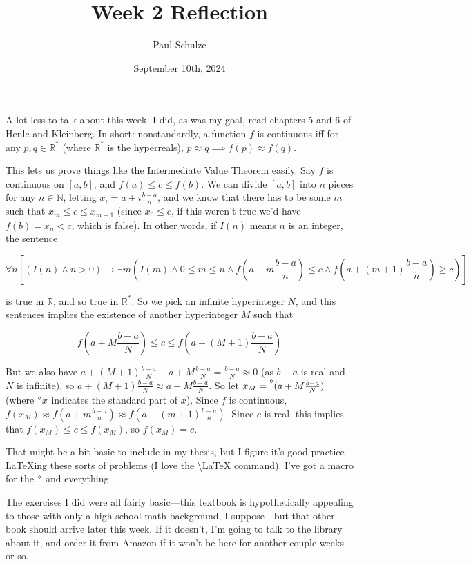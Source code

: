 \documentclass{article}
\title{Week 2 Reflection}
\author{Paul Schulze}
\date{September 10th, 2024}
\newcommand{\st}[1]{\prescript{\circ}{}{#1}}
\begin{document}
\maketitle

A lot less to talk about this week. I did, as was my goal, read chapters 5 and 6 of Henle and Kleinberg. In short: nonstandardly, a function $f$ is continuous iff for any $p, q \in \mathbb{R}^*$ (where $\mathbb{R}^*$ is the hyperreals), $p \approx q \implies f(p) \approx f(q)$.

This lets us prove things like the Intermediate Value Theorem easily. Say $f$ is continuous on $[a, b]$, and $f(a) \leq c \leq f(b)$. We can divide $[a, b]$ into $n$ pieces for any $n \in \mathbb{N}$, letting $x_i = a+i\frac{b-a}{n}$, and we know that there has to be some $m$ such that $x_m \leq c \leq x_{m+1}$ (since $x_0 \leq c$, if this weren't true we'd have $f(b) = x_n < c$, which is false). In other words, if $I(n)$ means $n$ is an integer, the sentence

\[\forall n \left[(I(n) \land n > 0) \rightarrow \exists m \left(I(m) \land 0 \leq m \leq n \land f\left(a+m\frac{b-a}{n}\right) \leq c \land f\left(a+(m+1)\frac{b-a}{n}\right) \geq c\right)\right]\]

is true in $\mathbb{R}$, and so true in $\mathbb{R}^*$. So we pick an infinite hyperinteger $N$, and this sentences implies the existence of another hyperinteger $M$ such that

\[ f\left(a+M\frac{b-a}{N}\right) \leq c \leq f\left(a+(M+1)\frac{b-a}{N}\right)\]

But we also have $a+(M+1)\frac{b-a}{N} - a+M\frac{b-a}{N} = \frac{b-a}{N} \approx 0$ (as $b-a$ is real and $N$ is infinite), so $a+(M+1)\frac{b-a}{N} \approx a+M\frac{b-a}{N}$. So let $x_M = \st{(a+M\frac{b-a}{N})}$ (where $\st{x}$ indicates the standard part of $x$). Since $f$ is continuous, $f(x_M) \approx f\left(a+m\frac{b-a}{n}\right) \approx f\left(a+(m+1)\frac{b-a}{n}\right)$. Since $c$ is real, this implies that $f(x_M) \leq c \leq f(x_M)$, so $f(x_M) = c$.

That might be a bit basic to include in my thesis, but I figure it's good practice \LaTeX ing these sorts of problems (I love the \textbackslash LaTeX command). I've got a macro for the $\st{}$ and everything.

The exercises I did were all fairly basic---this textbook is hypothetically appealing to those with only a high school math background, I suppose---but that other book should arrive later this week. If it doesn't, I'm going to talk to the library about it, and order it from Amazon if it won't be here for another couple weeks or so. 
\end{document}
